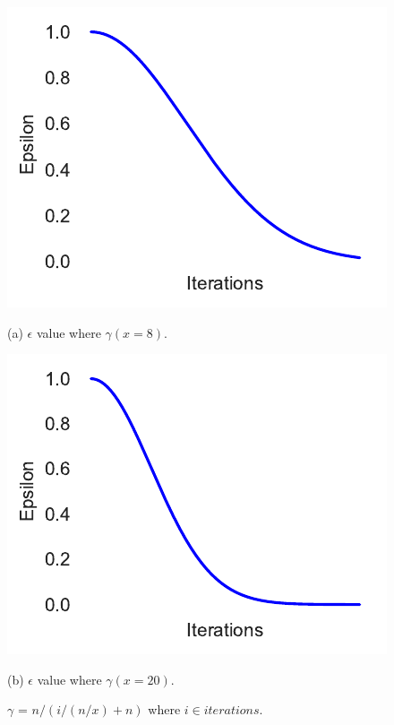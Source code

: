 \begin{figure}[htb]
    \begin{minipage}[b]{.48\linewidth}
        \centering
        \centerline{\includegraphics[width=\linewidth]{pommerman/plots/epsilon_8.pdf}}
        \centerline{(a) $\epsilon$ value where $\gamma(x=8)$.}\medskip
    \end{minipage}
    \hfill
    \begin{minipage}[b]{0.48\linewidth}
        \centering
        \centerline{\includegraphics[width=\linewidth]{pommerman/plots/epsilon_20.pdf}}
        \centerline{(b) $\epsilon$ value where $\gamma(x=20)$.}\medskip
    \end{minipage}
    \caption{$\gamma$ = $n / (i / (n / x) + n)$ where $i \in iterations$.}
    \label{fig:gamma}
\end{figure}

